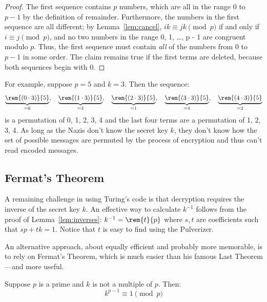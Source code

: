 \begin{proof}
The first sequence contains $p$ numbers, which are all in the range
$0$ to $p - 1$ by the definition of remainder.  Furthermore, the
numbers in the first sequence are all different; by
Lemma~\ref{lem:cancel}, $i k \equiv j k \pmod{p}$
if and only if $i \equiv j \pmod{p}$, and no two numbers in the range 0, 1,
\dots, p - 1 are congruent modulo $p$.  Thus, the first sequence must
contain \emph{all} of the numbers from 0 to $p - 1$ in some order.
The claim remains true if the first terms are deleted, because both
sequences begin with 0.
\end{proof}

For example, suppose $p = 5$ and $k = 3$.  Then the sequence:
%
\[
\underbrace{\rem{(0 \cdot 3)}{5}}_{=0},\quad
\underbrace{\rem{(1 \cdot 3)}{5}}_{=3},\quad
\underbrace{\rem{(2 \cdot 3)}{5}}_{=1},\quad
\underbrace{\rem{(3 \cdot 3)}{5}}_{=4},\quad
\underbrace{\rem{(4 \cdot 3)}{5}}_{=2}
\]
%
is a permutation of 0, 1, 2, 3, 4 and the last four terms are a
permutation of 1, 2, 3, 4.  As long as the Nazis don't know the secret key
$k$, they don't know how the set of possible messages are permuted by the
process of encryption and thus can't read encoded messages.


\subsection{Fermat's Theorem}

A remaining challenge in using Turing's code is that decryption requires
the inverse of the secret key $k$.  An effective way to calculate
$k^{-1}$ follows from the proof of Lemma~\ref{lem:inverses}: $k^{-1} =
\rem{t}{p}$ where $s,t$ are coefficients such that $sp+tk=1$.  Notice that
$t$ is easy to find using the Pulverizer.

An alternative approach, about equally efficient and probably more
memorable, is to rely on Fermat's Theorem, which is much easier than his
famous Last Theorem ---and more useful.

\begin{theorem}
Suppose $p$ is a prime and $k$ is not a multiple of $p$.  Then:
%
\[
k^{p-1} \equiv 1 \pmod{p}
\]
\end{theorem}

